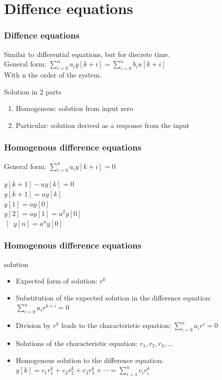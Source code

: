 \section{Diffence equations}
\begin{frame}
	\frametitle{Diffence equations}
	\begin{definition}
		Similar to differential equations, but for discrete time.\\
		General form: $\sum\limits_{i=0}^n a_iy[k+i] = \sum\limits_{i=0}^n b_iu[k+i]$\\
		With n  the order of the system.\\
	\end{definition}
	\begin{block}{Solution in 2 parts}
	\begin{enumerate}
			\item Homogenous: solution from input zero
			\item Particular: solution derived as a response from the input
	\end{enumerate}
	\end{block}
\end{frame}
\begin{frame}
	\frametitle{Homogenous difference equations}
	\begin{definition}
		General form: $\sum\limits_{i=0}^n a_iy[k+i]= 0$ \\
	\end{definition}
	\begin{example}
		$y[k+1] - ay[k] = 0$\\
		$y[k+1] = ay[k] $\\
		$y[1] = ay[0] $\\
		$y[2] = ay[1] = a^2y[0]$\\
		\vdots
		$y[n] = a^{n}y[0]$
	\end{example}

\end{frame}
\begin{frame}
	\frametitle{Homogenous difference equations}
	\begin{block}{solution}
		\begin{itemize}
			\item Expected form of solution: $r^{k}$ 
			\item 	Substitution of the expected solution in the difference equation:
			$\sum\limits_{i=0}^n a_ir^{k+i}= 0$
			\item Division by $r^{k}$ leads to the characteristic equation:
			$\sum\limits_{i=0}^n a_ir^{i}= 0$
			\item 	Solutions of the characteristic equation:
			$r_1,r_2,r_3,\dots$
			\item Homogenous solution to the difference equation: 
			$y[k] = c_1r_1^{k} + c_2r_2^{k} + c_3r_3^{k} + \cdots =\sum\limits_{i=1}^{n}c_ir_i^{k}$
		\end{itemize}
	\end{block}
\end{frame}
